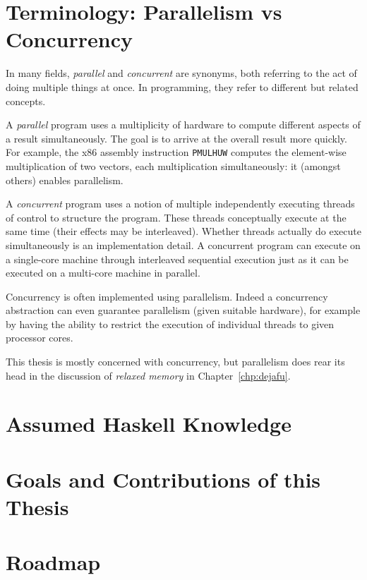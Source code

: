 \blindtext

\section{Terminology: Parallelism vs Concurrency}
\label{sec:intro-parconc}

In many fields, \emph{parallel} and \emph{concurrent} are synonyms, both referring to the act of
doing multiple things at once.  In programming, they refer to different but related concepts.

A \emph{parallel} program uses a multiplicity of hardware to compute different aspects of a result
simultaneously.  The goal is to arrive at the overall result more quickly.  For example, the x86
assembly instruction \verb#PMULHUW# computes the element-wise multiplication of two vectors, each
multiplication simultaneously: it (amongst others) enables parallelism.

A \emph{concurrent} program uses a notion of multiple independently executing threads of control to
structure the program.  These threads conceptually execute at the same time (their effects may be
interleaved).  Whether threads actually do execute simultaneously is an implementation detail.  A
concurrent program can execute on a single-core machine through interleaved sequential execution
just as it can be executed on a multi-core machine in parallel.

Concurrency is often implemented using parallelism.  Indeed a concurrency abstraction can even
guarantee parallelism (given suitable hardware), for example by having the ability to restrict the
execution of individual threads to given processor cores.

This thesis is mostly concerned with concurrency, but parallelism does rear its head in the
discussion of \emph{relaxed memory} in Chapter~\ref{chp:dejafu}.

\section{Assumed Haskell Knowledge}
\label{sec:intro-assumed}
\blindtext

\section{Goals and Contributions of this Thesis}
\label{sec:intro-contributions}
\blindtext

\section{Roadmap}
\label{sec:intro-roadmap}
\blindtext
